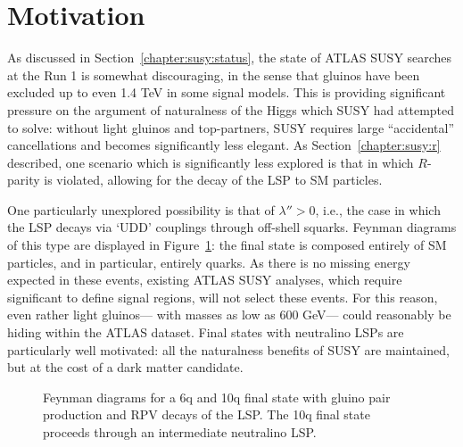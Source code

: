 \label{chapter:search}
\section{Motivation}

As discussed in Section~\ref{chapter:susy:status}, the state of ATLAS SUSY searches at the Run 1 is somewhat discouraging, in the sense that gluinos have been excluded up to even 1.4 TeV in some signal models. This is providing significant pressure on the argument of naturalness of the Higgs which SUSY had attempted to solve: without light gluinos and top-partners, SUSY requires large ``accidental'' cancellations and becomes significantly less elegant. As Section~\ref{chapter:susy:r} described, one scenario which is significantly less explored is that in which $R$-parity is violated, allowing for the decay of the LSP to SM particles. 

One particularly unexplored possibility is that of $\lambda'' > 0$, i.e., the case in which the LSP decays via `UDD' couplings through off-shell squarks. Feynman diagrams of this type are displayed in Figure~\ref{fig:search:motivation:diagrams}: the final state is composed entirely of SM particles, and in particular, entirely quarks. As there is no missing energy expected in these events, existing ATLAS SUSY analyses, which require significant \met to define signal regions, will not select these events. For this reason, even rather light gluinos--- with masses as low as 600 GeV--- could reasonably be hiding within the ATLAS dataset. Final states with neutralino LSPs are particularly well motivated: all the naturalness benefits of SUSY are maintained, but at the cost of a dark matter candidate. 


\begin{figure}
\centering
{}
\label{fig:search:motivation:diagrams}
\caption{Feynman diagrams for a 6q and 10q final state with gluino pair production and RPV decays of the LSP. The 10q final state proceeds through an intermediate neutralino LSP.}
\end{figure}


